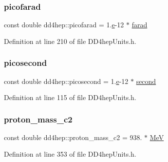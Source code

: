 \subsubsection{\texorpdfstring{picofarad}{picofarad}}
{\footnotesize\ttfamily const double dd4hep\+::picofarad = 1.\hyperlink{_volumes_8cpp_a8a9a1f93e9b09afccaec215310e64142}{e}-\/12 $\ast$ \hyperlink{namespacedd4hep_a520a532361cb9086c6d4c69ac195ddba}{farad}\hspace{0.3cm}{\ttfamily [static]}}



Definition at line 210 of file D\+D4hep\+Units.\+h.

\hypertarget{namespacedd4hep_a0ff865b7e95a5b6116c7a5497895bec3}{}\label{namespacedd4hep_a0ff865b7e95a5b6116c7a5497895bec3} 
\subsubsection{\texorpdfstring{picosecond}{picosecond}}
{\footnotesize\ttfamily const double dd4hep\+::picosecond = 1.\hyperlink{_volumes_8cpp_a8a9a1f93e9b09afccaec215310e64142}{e}-\/12 $\ast$ \hyperlink{namespacedd4hep_ac03364576705a245265d8ed6ea26b871}{second}\hspace{0.3cm}{\ttfamily [static]}}



Definition at line 115 of file D\+D4hep\+Units.\+h.

\hypertarget{namespacedd4hep_a368ce1f4ff6406804a6e11ba6c86ea3a}{}\label{namespacedd4hep_a368ce1f4ff6406804a6e11ba6c86ea3a} 
\subsubsection{\texorpdfstring{proton\+\_\+mass\+\_\+c2}{proton\_mass\_c2}}
{\footnotesize\ttfamily const double dd4hep\+::proton\+\_\+mass\+\_\+c2 = 938. $\ast$ \hyperlink{namespacedd4hep_a6dee62809c6ee54d2fc90671f4dc8b91}{MeV}\hspace{0.3cm}{\ttfamily [static]}}



Definition at line 353 of file D\+D4hep\+Units.\+h.

\hypertarget{namespacedd4hep_a9ceaf1c73ffb1a7f13abb23683ac32ba}{}\label{namespacedd4hep_a9ceaf1c73ffb1a7f13abb23683ac32ba} 
